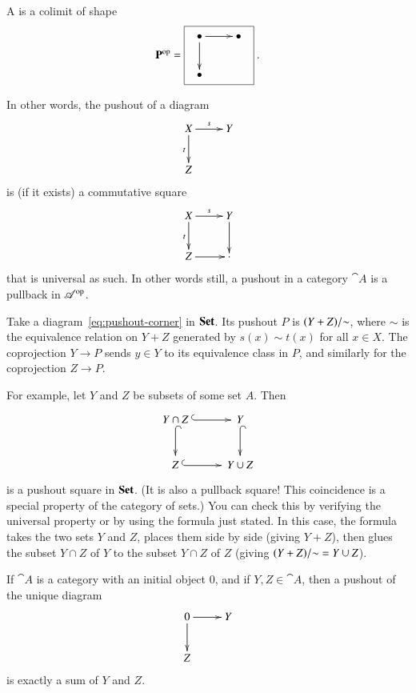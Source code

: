

\begin{defn}
A %
%
%
is a colimit of shape
\[
\scat{P}^\op
=
\fbox{%
$\begin{array}{c}
\xymatrix{
\bullet \ar[r] \ar[d]   &\bullet        \\
\bullet
}
\end{array}$}\ .
\]
\end{defn}

In other words, the pushout of a diagram
%
\begin{equation}
\label{eq:pushout-corner}
\begin{array}{c}
\xymatrix{
X \ar[r]^s \ar[d]_t     &Y      \\
Z
}
\end{array}
\end{equation}
%
is (if it exists) a commutative square
\[
\xymatrix{
X \ar[r]^s \ar[d]_t     &Y \ar[d]       \\
Z \ar[r]                &\cdot
}
\]
that is universal as such.  In other words still, a pushout in a category
$\cat{A}$ is a pullback in $\mathscr{A}^{\mathrm{op}}$.

\begin{example}
Take a diagram~\eqref{eq:pushout-corner} in $\mathbf{Set}$.  Its pushout%
%
%
$P$ is $(Y + Z)/\mathord{\sim}$, where $\sim$ is the equivalence relation on
$Y + Z$ generated by $s(x) \sim t(x)$ for all $x \in X$.  The coprojection
$Y \to P$ sends $y \in Y$ to its equivalence class in $P$, and similarly
for the coprojection $Z \to P$.

For example, let $Y$ and $Z$ be subsets of some set $A$.  Then
\[
\xymatrix@M+.5ex{
Y \cap Z \ar@{^{(}->}[r] \ar@{^{(}->}[d] &
Y \ar@{^{(}->}[d] \\
Z \ar@{^{(}->}[r]  &Y \cup Z
}
%
\index{union!pushout@as pushout}
\]
is a pushout square in $\mathbf{Set}$.  (It is also a pullback%
%
%
square!  This coincidence is a special property of the category of sets.)
You can check this by verifying the universal property or by using the
formula just stated.  In this case, the formula takes the two sets $Y$ and
$Z$, places them side by side (giving $Y + Z$), then glues the subset $Y
\cap Z$ of $Y$ to the subset $Y \cap Z$ of $Z$ (giving $(Y + Z)/\mathord{\sim}
= Y \cup Z$).
\end{example}

\begin{example}
If $\cat{A}$ is a category with an initial object $0$, and if $Y, Z \in
\cat{A}$, then a pushout of the unique diagram
\[
\xymatrix{
0 \ar[r] \ar[d] &Y      \\
Z
}
%
\index{sum!pushout@as pushout}
%
\]
is exactly a sum of $Y$ and $Z$.
\end{example}

